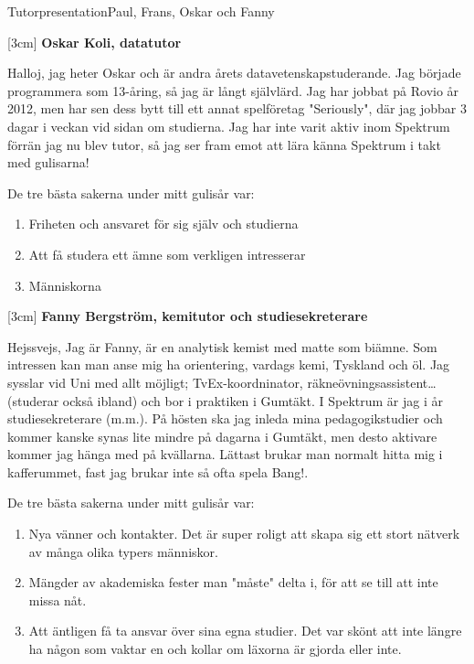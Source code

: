 \documentclass{spektraklet}
\begin{document}
\begin{artikel}{Tutorpresentation}{Paul, Frans, Oskar och Fanny}
\newpage

[3cm]
\textbf{Oskar Koli, datatutor}

Halloj, jag heter Oskar och är andra årets datavetenskapstuderande. Jag började programmera som 13-åring, så jag är långt självlärd. Jag har jobbat på Rovio år 2012, men har sen dess bytt till ett annat spelföretag "Seriously", där jag jobbar 3 dagar i veckan vid sidan om studierna. Jag har inte varit aktiv inom Spektrum förrän jag nu blev tutor, så jag ser fram emot att lära känna Spektrum i takt med gulisarna!

De tre bästa sakerna under mitt gulisår var:
\begin{enumerate}
\item Friheten och ansvaret för sig själv och studierna
\item Att få studera ett ämne som verkligen intresserar
\item Människorna
\end{enumerate}


[3cm]
\textbf{Fanny Bergström, kemitutor och studiesekreterare}

Hejssvejs,
Jag är Fanny, är en analytisk kemist med matte som biämne. Som intressen kan man anse mig ha orientering, vardags kemi, Tyskland och öl. Jag sysslar vid Uni med allt möjligt; TvEx-koordninator, räkneövningsassistent… (studerar också ibland) och bor i praktiken i Gumtäkt. I Spektrum är jag i år studiesekreterare (m.m.). På hösten ska jag inleda mina pedagogikstudier och kommer kanske synas lite mindre på dagarna i Gumtäkt, men desto aktivare kommer jag hänga med på kvällarna. Lättast brukar man normalt hitta mig i kafferummet, fast jag brukar inte så ofta spela Bang!.

De tre bästa sakerna under mitt gulisår var:
\begin{enumerate}
\item Nya vänner och kontakter. Det är super roligt att skapa sig ett stort nätverk av många olika typers människor.
\item Mängder av akademiska fester man "måste" delta i, för att se till att inte missa nåt.
\item Att äntligen få ta ansvar över sina egna studier. Det var skönt att inte längre ha någon som vaktar en och kollar om läxorna är gjorda eller inte.
\end{enumerate}

\end{artikel}
\end{document}
